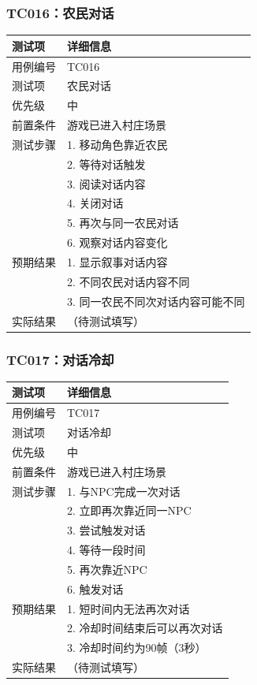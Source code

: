 \documentclass[a4paper,12pt]{article}
\begin{document}
\subsubsection{TC016：农民对话}
\begin{table}[h]
\centering
\begin{tabular}{ll}
\toprule
测试项 & 详细信息 \\
\midrule
用例编号 & TC016 \\
测试项 & 农民对话 \\
优先级 & 中 \\
前置条件 & 游戏已进入村庄场景 \\
测试步骤 & 1. 移动角色靠近农民 \\
 & 2. 等待对话触发 \\
 & 3. 阅读对话内容 \\
 & 4. 关闭对话 \\
 & 5. 再次与同一农民对话 \\
 & 6. 观察对话内容变化 \\
预期结果 & 1. 显示叙事对话内容 \\
 & 2. 不同农民对话内容不同 \\
 & 3. 同一农民不同次对话内容可能不同 \\
实际结果 & （待测试填写） \\
\bottomrule
\end{tabular}
\end{table}

\subsubsection{TC017：对话冷却}
\begin{table}[h]
\centering
\begin{tabular}{ll}
\toprule
测试项 & 详细信息 \\
\midrule
用例编号 & TC017 \\
测试项 & 对话冷却 \\
优先级 & 中 \\
前置条件 & 游戏已进入村庄场景 \\
测试步骤 & 1. 与NPC完成一次对话 \\
 & 2. 立即再次靠近同一NPC \\
 & 3. 尝试触发对话 \\
 & 4. 等待一段时间 \\
 & 5. 再次靠近NPC \\
 & 6. 触发对话 \\
预期结果 & 1. 短时间内无法再次对话 \\
 & 2. 冷却时间结束后可以再次对话 \\
 & 3. 冷却时间约为90帧（3秒） \\
实际结果 & （待测试填写） \\
\bottomrule
\end{tabular}
\end{table}
\end{document}
